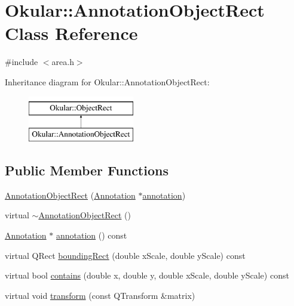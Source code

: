 \hypertarget{classOkular_1_1AnnotationObjectRect}{\section{Okular\+:\+:Annotation\+Object\+Rect Class Reference}
\label{classOkular_1_1AnnotationObjectRect}
}


{\ttfamily \#include $<$area.\+h$>$}

Inheritance diagram for Okular\+:\+:Annotation\+Object\+Rect\+:\begin{figure}[H]
\begin{center}
\leavevmode
\includegraphics[height=2.000000cm]{classOkular_1_1AnnotationObjectRect}
\end{center}
\end{figure}
\subsection*{Public Member Functions}
\begin{DoxyCompactItemize}
\item 
\hyperlink{classOkular_1_1AnnotationObjectRect_a354e67fd4b871c538f6fb426a131750f}{Annotation\+Object\+Rect} (\hyperlink{classOkular_1_1Annotation}{Annotation} $\ast$\hyperlink{classOkular_1_1AnnotationObjectRect_ab44473e0817a058930e9a95d1773067d}{annotation})
\item 
virtual \hyperlink{classOkular_1_1AnnotationObjectRect_a6af3aeedc67e3bf0a3706bd837fdd9bf}{$\sim$\+Annotation\+Object\+Rect} ()
\item 
\hyperlink{classOkular_1_1Annotation}{Annotation} $\ast$ \hyperlink{classOkular_1_1AnnotationObjectRect_ab44473e0817a058930e9a95d1773067d}{annotation} () const 
\item 
virtual Q\+Rect \hyperlink{classOkular_1_1AnnotationObjectRect_a9ff5aa8673b33196df0cb14d51dacef2}{bounding\+Rect} (double x\+Scale, double y\+Scale) const 
\item 
virtual bool \hyperlink{classOkular_1_1AnnotationObjectRect_a1ca7ee341122db5f40af45ffd4607017}{contains} (double x, double y, double x\+Scale, double y\+Scale) const 
\item 
virtual void \hyperlink{classOkular_1_1AnnotationObjectRect_af61b2cdb3787c76bd6b53f0aa18c4476}{transform} (const Q\+Transform \&matrix)
\end{DoxyCompactItemize}
